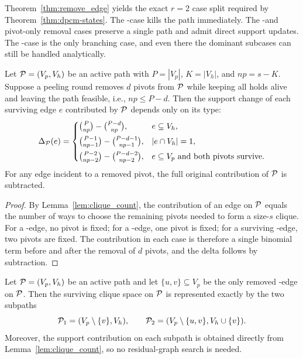 Theorem~\ref{thm:remove_edge} yields the exact $r{=}2$ case split required by Theorem~\ref{thm:dpcm-states}.
%
The \hold-\hold case kills the path immediately.
%
The \hold-\pivot and pivot-only removal cases preserve a single path and admit direct support updates.
%
The \pivot-\pivot case is the only branching case, and even there the dominant subcases can still be handled analytically.

\begin{theorem}\label{thm:r2_pivot_delta}
Let $\TPath=(V_p,V_h)$ be an active path with $P=|V_p|$, $K=|V_h|$, and $\mathit{np}=s-K$.
Suppose a peeling round removes $d$ pivots from $\TPath$ while keeping all holds alive and leaving the path feasible, i.e., $\mathit{np}\le P-d$.
Then the support change of each surviving edge $e$ contributed by $\TPath$ depends only on its type:
\[
\Delta_{\TPath}(e)=
\begin{cases}
\binom{P}{\mathit{np}}-\binom{P-d}{\mathit{np}}, & e\subseteq V_h,\\[4pt]
\binom{P-1}{\mathit{np}-1}-\binom{P-d-1}{\mathit{np}-1}, & |e\cap V_h|=1,\\[4pt]
\binom{P-2}{\mathit{np}-2}-\binom{P-d-2}{\mathit{np}-2}, & e\subseteq V_p \text{ and both pivots survive.}
\end{cases}
\]
For any edge incident to a removed pivot, the full original contribution of $\TPath$ is subtracted.
\end{theorem}

\begin{proof}
By Lemma~\ref{lem:clique_count}, the contribution of an edge on $\TPath$ equals the number of ways to choose the remaining pivots needed to form a size-$s$ clique.
%
For a \hold-\hold edge, no pivot is fixed; for a \hold-\pivot edge, one pivot is fixed; for a surviving \pivot-\pivot edge, two pivots are fixed.
%
The contribution in each case is therefore a single binomial term before and after the removal of $d$ pivots, and the delta follows by subtraction.
\end{proof}

\begin{theorem}\label{thm:r2_single_split}
Let $\TPath=(V_p,V_h)$ be an active path and let $\{u,v\}\subseteq V_p$ be the only removed \pivot-\pivot edge on $\TPath$.
Then the surviving clique space on $\TPath$ is represented exactly by the two subpaths
\[
\TPath_1=(V_p\setminus\{v\},V_h), \qquad
\TPath_2=(V_p\setminus\{u,v\},V_h\cup\{v\}).
\]
Moreover, the support contribution on each subpath is obtained directly from Lemma~\ref{lem:clique_count}, so no residual-graph search is needed.
\end{theorem}

